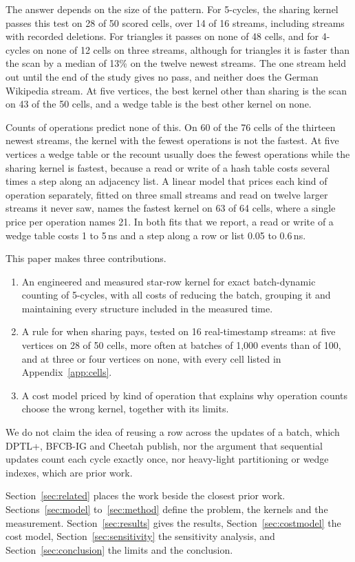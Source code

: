 The answer depends on the size of the pattern.
For 5-cycles, the sharing kernel passes this test on 28 of 50 scored cells, over 14 of 16 streams, including streams with recorded deletions.
For triangles it passes on none of 48 cells, and for 4-cycles on none of 12 cells on three streams, although for triangles it is faster than the scan by a median of 13\% on the twelve newest streams.
The one stream held out until the end of the study gives no pass, and neither does the German Wikipedia stream.
At five vertices, the best kernel other than sharing is the scan on 43 of the 50 cells, and a wedge table is the best other kernel on none.

Counts of operations predict none of this.
On 60 of the 76 cells of the thirteen newest streams, the kernel with the fewest operations is not the fastest. At five vertices a wedge table or the recount usually does the fewest operations while the sharing kernel is fastest, because a read or write of a hash table costs several times a step along an adjacency list.
A linear model that prices each kind of operation separately, fitted on three small streams and read on twelve larger streams it never saw, names the fastest kernel on 63 of 64 cells, where a single price per operation names 21.
In both fits that we report, a read or write of a wedge table costs 1 to 5\,ns and a step along a row or list 0.05 to 0.6\,ns.

This paper makes three contributions.
\begin{enumerate}
  \item An engineered and measured star-row kernel for exact batch-dynamic counting of 5-cycles, with all costs of reducing the batch, grouping it and maintaining every structure included in the measured time.
  \item A rule for when sharing pays, tested on 16 real-timestamp streams: at five vertices on 28 of 50 cells, more often at batches of 1,000 events than of 100, and at three or four vertices on none, with every cell listed in Appendix~\ref{app:cells}.
  \item A cost model priced by kind of operation that explains why operation counts choose the wrong kernel, together with its limits.
\end{enumerate}
We do not claim the idea of reusing a row across the updates of a batch, which DPTL+, BFCB-IG and Cheetah publish, nor the argument that sequential updates count each cycle exactly once, nor heavy-light partitioning or wedge indexes, which are prior work.

Section~\ref{sec:related} places the work beside the closest prior work.
Sections~\ref{sec:model} to~\ref{sec:method} define the problem, the kernels and the measurement.
Section~\ref{sec:results} gives the results, Section~\ref{sec:costmodel} the cost model, Section~\ref{sec:sensitivity} the sensitivity analysis, and Section~\ref{sec:conclusion} the limits and the conclusion.
